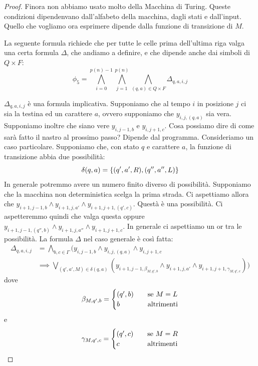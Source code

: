\begin{proof}
    Finora non abbiamo usato molto della Macchina di Turing. Queste condizioni dipendenvano
    dall'alfabeto della macchina, dagli stati e dall'input. Quello che vogliamo ora esprimere
    dipende dalla funzione di transizione di $M$.

    La seguente formula richiede che per tutte le celle prima dell'ultima riga valga una certa
    formula $\Delta$, che andiamo a definire, e che dipende anche dai simboli di $Q \times F$:
    \begin{equation*}
        \phi_{5} = \bigwedge_{i=0}^{p(n)-1}\bigwedge_{j=1}^{p(n)}\bigwedge_{(q,a)\in Q\times F}
        \Delta_{q,a,i,j}
    \end{equation*}


    $\Delta_{q,a,i,j}$ è una formula implicativa. Supponiamo che al tempo $i$ in posizione $j$ ci
    sia la testina ed un carattere $a$, ovvero supponiamo che $y_{i,j,(q,a)}$ sia vera. Supponiamo
    inoltre che siano vere $y_{i,j-1,b}$ e $y_{i,j+1,c}$. Cosa possiamo dire di come sarà fatto il
    nastro al prossimo passo? Dipende dal programma. Consideriamo un caso particolare. Supponiamo
    che, con stato $q$ e carattere $a$, la funzione di transizione abbia due possibilità:
    \begin{equation*}
        \delta(q,a) = \left\{(q',a',R),(q'',a'',L)\right\}
    \end{equation*}
    In generale potremmo avere un numero finito diverso di possibilità. Supponiamo che la macchina non
    deterministica scelga la prima strada. Ci aspettiamo allora che $y_{i+1,j-1,b} \land y_{i+1,j,a'}
    \land y_{i+1,j+1,(q',c)}$. Questà è una possibilità. Ci aspetteremmo quindi che valga questa oppure
    $y_{i+1,j-1,(q'',b)} \land y_{i+1,j,a''} \land y_{i+1,j+1,c}$. In generale ci aspettiamo un or tra le
    possibilità. 
    La formula $\Delta$ nel caso generale è così fatta:
    \begin{align*}
        \Delta_{q,a,i,j} &= \bigwedge_{b,c \in \Gamma}( y_{i,j-1,b} \land y_{i,j,(q,a)} \land
        y_{i,j+1,c} \\ &\implies \bigvee_{(q',a',M) \in \delta(q,a)}(y_{i+1,j-1,\beta_{M,q',b}} \land
        y_{i+1,j,a'} \land y_{i+1,j+1,\gamma_{M,q',c}}))
    \end{align*}
    dove
    \begin{equation*}
        \beta_{M,q',b} =
        \begin{cases}
            (q',b) \quad &\text{se $M = L$}\\
            b \quad &\text{altrimenti}\\
        \end{cases}
    \end{equation*}
    e
    \begin{equation*}
        \gamma_{M,q',c} =
        \begin{cases}
            (q',c) \quad &\text{se $M = R$}\\
            c \quad &\text{altrimenti}\\
        \end{cases}
    \end{equation*}


\end{proof}
